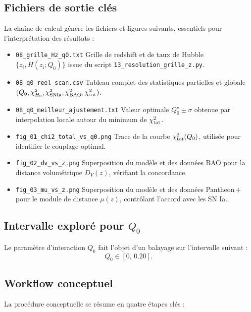 \subsection{Fichiers de sortie clés}

La chaîne de calcul génère les fichiers et figures suivants, essentiels pour l’interprétation des résultats :

\begin{itemize}
  \item \texttt{08\_grille\_Hz\_q0.txt}
    Grille de redshift et de taux de Hubble \(\{z_{i},H(z_{i};Q_{0})\}\) issue du script \texttt{13\_resolution\_grille\_z.py}.
  \item \texttt{08\_q0\_reel\_scan.csv}
    Tableau complet des statistiques partielles et globale
    \((Q_{0},\chi^{2}_{H_{0}},\chi^{2}_{\rm SNIa},\chi^{2}_{\rm BAO},\chi^{2}_{\rm tot})\).
  \item \texttt{08\_q0\_meilleur\_ajustement.txt}
    Valeur optimale \(Q_{0}^{\star}\pm\sigma\) obtenue par interpolation locale autour du minimum de \(\chi^{2}_{\rm tot}\).
  \item \texttt{fig\_01\_chi2\_total\_vs\_q0.png}
    Trace de la courbe \(\chi^{2}_{\rm tot}(Q_{0})\), utilisée pour identifier le couplage optimal.
  \item \texttt{fig\_02\_dv\_vs\_z.png}
    Superposition du modèle et des données BAO pour la distance volumétrique \(D_{V}(z)\), vérifiant la concordance.
  \item \texttt{fig\_03\_mu\_vs\_z.png}
    Superposition du modèle et des données Pantheon\,+ pour le module de distance \(\mu(z)\), contrôlant l’accord avec les SN Ia.
\end{itemize}

\subsection{Intervalle exploré pour \(Q_{0}\)}

Le paramètre d’interaction \(Q_{0}\) fait l’objet d’un balayage sur l’intervalle suivant :
\[
  Q_{0}\in[0,\,0.20].
\]

\subsection{Workflow conceptuel}

La procédure conceptuelle se résume en quatre étapes clés :

